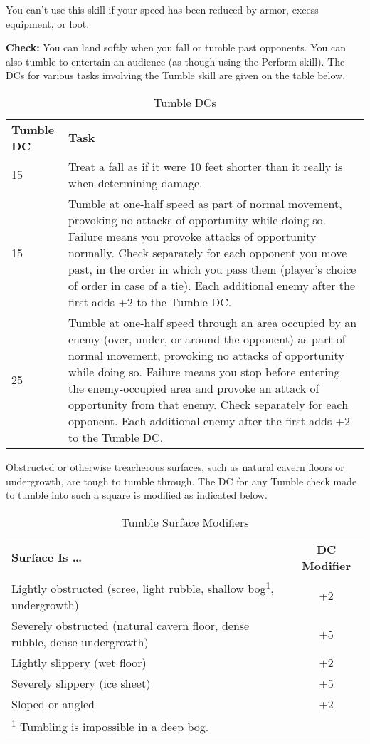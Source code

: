 
You can't use this skill if your speed has been reduced by armor, excess equipment, 
or loot.

\textbf{Check:} You can land softly when you fall or tumble past opponents. You 
can also tumble to entertain an audience (as though using the Perform skill). The 
DCs for various tasks involving the Tumble skill are given on the table below.

\begin{table}[htb]
\caption{Tumble DCs}
\centering
\begin{tabular}{l p{14cm}}
\textbf{Tumble DC} & \textbf{Task}\\
15 & Treat a fall as if it were 10 feet shorter than it really is when determining damage.\\
15 & Tumble at one-half speed as part of normal movement, provoking no attacks of opportunity while doing so. Failure means you provoke attacks of opportunity normally. Check separately for each opponent you move past, in the order in which you pass them (player’s choice of order in case of a tie). Each additional enemy after the first adds +2 to the Tumble DC.\\
25 & Tumble at one-half speed through an area occupied by an enemy (over, under, or around the opponent) as part of normal movement, provoking no attacks of opportunity while doing so. Failure means you stop before entering the enemy-occupied area and provoke an attack of opportunity from that enemy. Check separately for each opponent. Each additional enemy after the first adds +2 to the Tumble DC.\\
\end{tabular}
\end{table}

Obstructed or otherwise treacherous surfaces, such as natural cavern floors or 
undergrowth, are tough to tumble through. The DC for any Tumble check made to tumble 
into such a square is modified as indicated below.

\begin{table}[htb]
\caption{Tumble Surface Modifiers}
\centering
\begin{tabular}{l c}
\textbf{Surface Is \ldots{}} & \textbf{DC Modifier}\\
Lightly obstructed (scree, light rubble, shallow bog\textsuperscript{1}, undergrowth) & +2\\
Severely obstructed (natural cavern floor, dense rubble, dense undergrowth) & +5\\
Lightly slippery (wet floor) & +2\\
Severely slippery (ice sheet) & +5\\
Sloped or angled & +2\\
\multicolumn{2}{p{6cm}}{\textsuperscript{1} Tumbling is impossible in a deep bog.}\\
\end{tabular}
\end{table}


